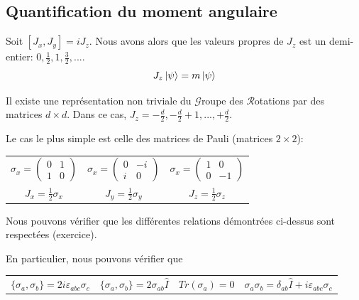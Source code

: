 \documentclass[../notesdecours.tex]{subfiles}
\begin{document}
\subsection{Quantification du moment angulaire}
\begin{theorem}
Soit $[J_x,J_y] = iJ_z$. Nous avons alors que les valeurs propres de $J_z$ est un demi-entier: $0,\frac{1}{2}, 1, \frac{3}{2}, ...$.
\begin{equation*}
J_z \ket{\psi} = m\ket{\psi}
\end{equation*}
\end{theorem}

\begin{theorem}
Il existe une représentation non triviale du $\mathcal{G}$roupe des $\mathcal{R}$otations par des matrices $d\times d$. Dans ce cas, $J_z = -\frac{d}{2}, -\frac{d}{2}+1,...,+\frac{d}{2}$.
\end{theorem}
\begin{exemple}
Le cas le plus simple est celle des matrices de Pauli (matrices $2\times 2$):
\begin{center}
\begin{tabular}{c|c|c}
$\sigma_x = \begin{pmatrix}
0 & 1\\
1 & 0
\end{pmatrix}$ & $\sigma_x = \begin{pmatrix}
0 & -i\\
i & 0
\end{pmatrix}$ & $\sigma_x = \begin{pmatrix}
1 & 0\\
0 & -1
\end{pmatrix}$\\
$J_x = \frac{1}{2}\sigma_x$ & $J_y = \frac{1}{2}\sigma_y$ & $J_z = \frac{1}{2}\sigma_z$
\end{tabular}
\end{center}
Nous pouvons vérifier que les différentes relations démontrées ci-dessus sont respectées (exercice).
\end{exemple}

En particulier, nous pouvons vérifier que 
\begin{center}
    \begin{tabular}{c|c|c|c}
        $\{\sigma_a,\sigma_b\} = 2i\varepsilon_{abc}\sigma_c$ & $\{\sigma_a,\sigma_b\} = 2\sigma_{ab}\hat{I}$ & $Tr(\sigma_a) = 0$ & $\sigma_a\sigma_b = \delta_{ab}\hat{I}+i\varepsilon_{abc}\sigma_c$
    \end{tabular}
\end{center}
\end{document}
